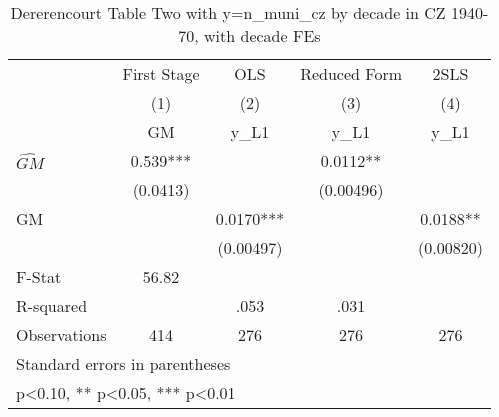 \begin{table}[htbp]\centering
\def\sym#1{\ifmmode^{#1}\else\(^{#1}\)\fi}
\caption{Dererencourt Table Two with y=n\_muni\_cz by decade in CZ 1940-70, with decade FEs}
\begin{tabular}{l*{4}{c}}
\toprule
                    & First Stage   &         OLS   &Reduced Form   &        2SLS   \\
                    &\multicolumn{1}{c}{(1)}&\multicolumn{1}{c}{(2)}&\multicolumn{1}{c}{(3)}&\multicolumn{1}{c}{(4)}\\
                    &\multicolumn{1}{c}{GM}&\multicolumn{1}{c}{y\_L1}&\multicolumn{1}{c}{y\_L1}&\multicolumn{1}{c}{y\_L1}\\
\midrule
$\hat{GM}$          &       0.539***&               &      0.0112** &               \\
                    &    (0.0413)   &               &   (0.00496)   &               \\
\addlinespace
GM                  &               &      0.0170***&               &      0.0188** \\
                    &               &   (0.00497)   &               &   (0.00820)   \\
\midrule
F-Stat              &       56.82   &               &               &               \\
R-squared           &               &        .053   &        .031   &               \\
Observations        &         414   &         276   &         276   &         276   \\
\bottomrule
\multicolumn{5}{l}{\footnotesize Standard errors in parentheses}\\
\multicolumn{5}{l}{\footnotesize * p<0.10, ** p<0.05, *** p<0.01}\\
\end{tabular}
\end{table}
